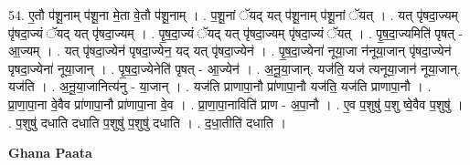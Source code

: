\documentclass[17pt]{extarticle}
\begin{document}
54. ए॒तौ प॑शू॒नाम् प॑शू॒ना मे॒ता वे॒तौ प॑शू॒नाम् । . प॒शू॒नां ॅयद् यत् प॑शू॒नाम् प॑शू॒नां ॅयत् । . यत् पृ॑षदा॒ज्यम् पृ॑षदा॒ज्यं ॅयद् यत् पृ॑षदा॒ज्यम् । . पृ॒ष॒दा॒ज्यं ॅयद् यत् पृ॑षदा॒ज्यम् पृ॑षदा॒ज्यं ॅयत् । . पृ॒ष॒दा॒ज्यमिति॑ पृषत् - आ॒ज्यम् । . यत् पृ॑षदा॒ज्येन॑ पृषदा॒ज्येन॒ यद् यत् पृ॑षदा॒ज्येन॑ । . पृ॒ष॒दा॒ज्येना॑ नूया॒जा न॑नूया॒जान् पृ॑षदा॒ज्येन॑ पृषदा॒ज्येना॑ नूया॒जान् । . पृ॒ष॒दा॒ज्येनेति॑ पृषत् - आ॒ज्येन॑ । . अ॒नू॒या॒जान्. यज॑ति॒ यज॑ त्यनूया॒जान॑ नूया॒जान्. यज॑ति । . अ॒नू॒या॒जानित्य॑नु - या॒जान् । . यज॑ति प्राणापा॒नौ प्रा॑णापा॒नौ यज॑ति॒ यज॑ति प्राणापा॒नौ । . प्रा॒णा॒पा॒ना वे॒वैव प्रा॑णापा॒नौ प्रा॑णापा॒ना वे॒व । . प्रा॒णा॒पा॒नाविति॑ प्राण - अ॒पा॒नौ । . ए॒व प॒शुषु॑ प॒शु ष्वे॒वैव प॒शुषु॑ । . प॒शुषु॑ दधाति दधाति प॒शुषु॑ प॒शुषु॑ दधाति । . द॒धा॒तीति॑ दधाति । \newline

\textbf{Ghana Paata } \newline
\end{document}
